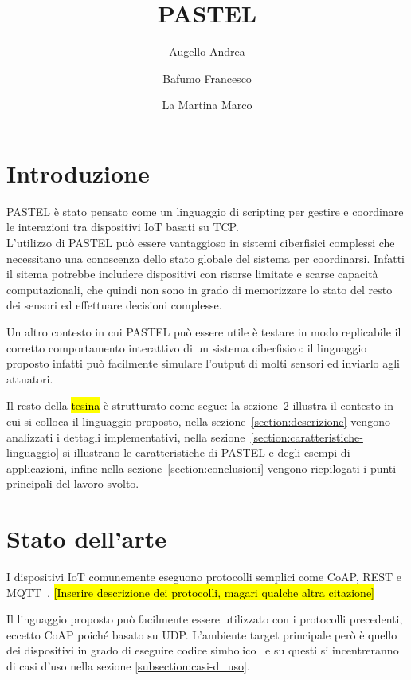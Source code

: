 \documentclass[]{article}
\title{PASTEL}
\author{{Augello Andrea} \and {Bafumo Francesco} \and{La Martina Marco}}
\newcommand{\hlc}[2][yellow]{ {\sethlcolor{#1} \hl{#2}} }
\begin{document}
\maketitle
\tableofcontents


\section{Introduzione}
PASTEL è stato pensato come un linguaggio di scripting per gestire e coordinare le interazioni tra dispositivi IoT basati su TCP.\\
L'utilizzo di PASTEL può essere vantaggioso in sistemi ciberfisici complessi che necessitano una conoscenza dello stato globale del sistema per coordinarsi. Infatti il sitema potrebbe includere dispositivi con risorse limitate e scarse capacità computazionali, che quindi non sono in grado di memorizzare lo stato del resto dei sensori ed effettuare decisioni complesse. 

Un altro contesto in cui PASTEL può essere utile è testare in modo replicabile il corretto comportamento interattivo di un sistema ciberfisico: il linguaggio proposto infatti può facilmente simulare l'output di molti sensori ed inviarlo agli attuatori.

Il resto della \hl{tesina} è strutturato come segue: la sezione~\ref{section:stato-arte} illustra il contesto in cui si colloca il linguaggio proposto, nella sezione~\ref{section:descrizione} vengono analizzati i dettagli implementativi, nella sezione~\ref{section:caratteristiche-linguaggio} si illustrano le caratteristiche di PASTEL e degli esempi di applicazioni, infine nella sezione~\ref{section:conclusioni} vengono riepilogati i punti principali del lavoro svolto.

\section{Stato dell'arte}\label{section:stato-arte}

I dispositivi IoT comunemente eseguono protocolli semplici come CoAP, REST e MQTT~\cite{tandale2017empirical}. \hlc[cyan]{[Inserire descrizione dei protocolli, magari qualche altra citazione]}

Il linguaggio proposto può facilmente essere utilizzato con i protocolli precedenti, eccetto CoAP poiché basato su UDP. L'ambiente target principale però è quello dei dispositivi in grado di eseguire codice simbolico~\cite{gaglio2017dc4cd} e su questi si incentreranno di casi d'uso nella sezione \ref{subsection:casi-d_uso}.  
\end{document}
